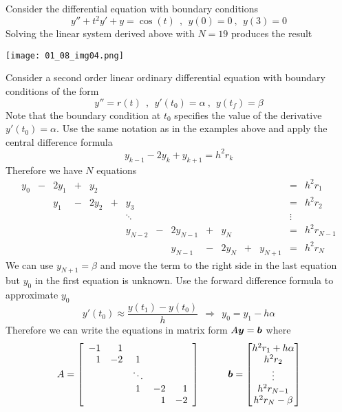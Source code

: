 \begin{example}
Consider the differential equation with boundary conditions
$$
y'' + t^2y' + y = \cos(t) \ \ , \ \ y(0) = 0 \ , \ \ y(3) = 0
$$
Solving the linear system derived above with $N=19$ produces the result
\begin{center}
\texttt{[image: 01\_08\_img04.png]}
\end{center}
\end{example}

\begin{example}
Consider a second order linear ordinary differential equation with boundary conditions of the form
$$
y'' = r(t) \ \ , \ \ y'(t_0) = \alpha \ , \ \ y(t_f) = \beta
$$
Note that the boundary condition at $t_0$ specifies the value of the derivative $y'(t_0) = \alpha$. Use the same notation as in the examples above and apply the central difference formula
$$
y_{k-1} -2y_k + y_{k+1} = h^2 r_k
$$
Therefore we have $N$ equations 
$$
\begin{array}{rrrrrrcrrrrrrcc}
y_0 & - & 2y_1 & + & y_2 & & & & & & & & & = & h^2 r_1 \\
& & y_1 & - & 2y_2 & + & y_3 & & & & & & & = & h^2 r_2 \\
& & & & & & \ddots & & & & & & & \vdots & \\
& & & & & & y_{N-2} & - & 2y_{N-1} & + & y_N & & & = & h^2 r_{N-1} \\
& & & & & & & & y_{N-1} & - & 2y_N & + & y_{N+1} & = & h^2 r_N
\end{array}
$$
We can use $y_{N+1} = \beta$ and move the term to the right side in the last equation but $y_0$ in the first equation is unknown. Use the forward difference formula to approximate $y_0$
$$
y'(t_0) \approx \frac{y(t_1) - y(t_0)}{h}
\ \ \Rightarrow \ \
y_0 = y_1 - h \alpha
$$
Therefore we can write the equations in matrix form $A \boldsymbol{y} = \boldsymbol{b}$ where
$$
A =
\left[ \begin{array}{rrcrr}
-1 & 1 & & & \\
1 & -2 & 1 & & \\
& & \ddots & & \\
& & 1 & -2 & 1 \\
& & & 1 & -2
\end{array} \right]
\hspace{10mm}
\bs{b} = 
\begin{bmatrix}
h^2 r_1 + h\alpha \\ h^2 r_2 \\ \vdots \\ h^2 r_{N-1} \\ h^2 r_N - \beta
\end{bmatrix}
$$
\end{example}